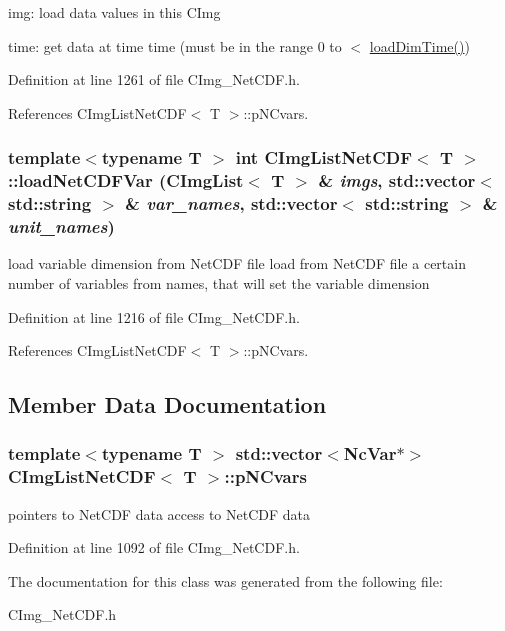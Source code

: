 \begin{DoxyItemize}
\item img: load data values in this {\ttfamily CImg} \item time: get data at time {\ttfamily time} (must be in the range 0 to $<$ {\ttfamily \hyperlink{classCImgNetCDF_a2ad26dcd306b26255c307e4f6d881240}{loadDimTime()}})\end{DoxyItemize}

\begin{DoxyCode}
\end{DoxyCode}
 

Definition at line 1261 of file CImg\_\-NetCDF.h.

References CImgListNetCDF$<$ T $>$::pNCvars.\hypertarget{classCImgListNetCDF_ad01786b8525fdd438288db3ff23c8125}{
\subsubsection[{loadNetCDFVar}]{\setlength{\rightskip}{0pt plus 5cm}template$<$typename T $>$ int {\bf CImgListNetCDF}$<$ T $>$::loadNetCDFVar (CImgList$<$ T $>$ \& {\em imgs}, \/  std::vector$<$ std::string $>$ \& {\em var\_\-names}, \/  std::vector$<$ std::string $>$ \& {\em unit\_\-names})}}
\label{classCImgListNetCDF_ad01786b8525fdd438288db3ff23c8125}


load variable dimension from NetCDF file load from NetCDF file a certain number of variables from names, that will set the variable dimension


\begin{DoxyCode}
\end{DoxyCode}
 

Definition at line 1216 of file CImg\_\-NetCDF.h.

References CImgListNetCDF$<$ T $>$::pNCvars.

\subsection{Member Data Documentation}
\hypertarget{classCImgListNetCDF_ad071043e517bec99d567e4b56630b865}{
\subsubsection[{pNCvars}]{\setlength{\rightskip}{0pt plus 5cm}template$<$typename T $>$ std::vector$<$NcVar$\ast$$>$ {\bf CImgListNetCDF}$<$ T $>$::{\bf pNCvars}}}
\label{classCImgListNetCDF_ad071043e517bec99d567e4b56630b865}


pointers to NetCDF data access to NetCDF data


\begin{DoxyCode}
\end{DoxyCode}
 

Definition at line 1092 of file CImg\_\-NetCDF.h.

The documentation for this class was generated from the following file:\begin{DoxyCompactItemize}
\item 
CImg\_\-NetCDF.h\end{DoxyCompactItemize}

